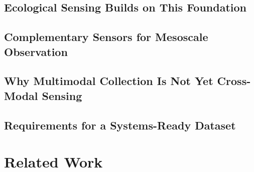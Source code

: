 \documentclass[manuscript]{acmart}
\begin{document}

\subsection{Ecological Sensing Builds on This Foundation}


\subsection{Complementary Sensors for Mesoscale Observation}

%

\subsection{Why Multimodal Collection Is Not Yet Cross-Modal Sensing}


\subsection{Requirements for a Systems-Ready Dataset}



\newpage
\section{Related Work}
\label{sec:related}
\end{document}
